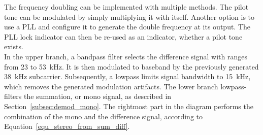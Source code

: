 The frequency doubling can be implemented with multiple methods.
The pilot tone can be modulated by simply multiplying it with itself.
Another option is to use a PLL and configure it to generate the double frequency at its output.
The PLL lock indicator can then be re-used as an indicator, whether a pilot tone exists.\\

In the upper branch, a bandpass filter selects the difference signal with ranges from 23 to 53~kHz.
It is then modulated to baseband by the previously generated 38~kHz subcarrier.
Subsequently, a lowpass limits signal bandwidth to 15~kHz, which removes the generated modulation artifacts.
The lower branch lowpass-filters the summation, or mono signal, as described in Section~\ref{subsec:demod_mono}.
The rightmost part in the diagram performs the combination of the mono and the difference signal, according to Equation~\eqref{equ_stereo_from_sum_diff}.
